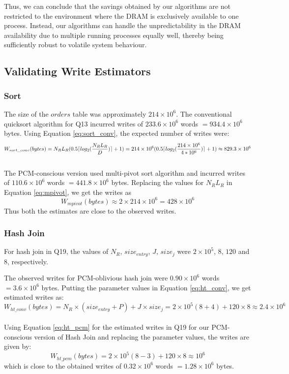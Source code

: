 Thus, we can conclude that the savings obtained by our algorithms are
not restricted to the environment where the DRAM is exclusively available
to one process. Instead, our algorithms can handle the unpredictability
in the DRAM availability due to multiple running processes equally well,
thereby being sufficiently robust to volatile system behaviour.

\subsection{Validating Write Estimators}
\label{validation}
\subsubsection{Sort}

The size of the $orders$ table was approximately $214 \times 10^6$. The conventional quicksort algorithm for Q13 incurred writes of $233.6 \times 10^6$ words $= 934.4 \times 10^6 $bytes. Using Equation \ref{eq:sort_conv}, the expected number of writes were: \\
\begin{dmath}
W_{sort\_conv}(bytes) = N_RL_R (0.5 \lceil log_2(\frac{N_R L_R}{D}) \rceil + 1) \\
= 214 \times 10^6 (0.5 \lceil log_2(\frac{214 \times 10^6}{4 * 10^6}) \rceil + 1) \approx 829.3 \times 10^6 
\end{dmath}
\\
The PCM-conscious version used multi-pivot sort algorithm and incurred writes of $110.6 \times 10^6$ words $= 441.8 \times 10^6 $ bytes. Replacing the values for $N_R L_R$ in Equation \ref{eq:mpivot}, we get the writes as $$W_{mpivot}(bytes) \approx 2 \times 214 \times 10^6  = 428 \times 10^6 $$
Thus both the estimates are close to the observed writes.

\subsubsection{Hash Join}
For hash join in Q19, the values of $N_R$, $size_{entry}$, $J$, $size_{j}$ were $2 \times 10^5$, $8$, $120$ and $8$, respectively. 

The observed writes for PCM-oblivious hash join were $0.90 \times 10^6$ words $= 3.6 \times 10^6$ bytes. Putting the parameter values in Equation \ref{eq:ht_conv}, we get estimated writes as: \\
\begin{dmath}
W_{ht\_conv}(bytes) = N_R \times (size_{entry} + P) + J \times size_{j} =  2 \times 10^5 (8+4) + 120 \times 8 \approx 2.4 \times 10^6 
\end{dmath}
\\
 Using Equation \ref{eq:ht_pcm} for the estimated writes in Q19 for our PCM-conscious version of Hash Join and replacing the  parameter values, the writes are given by:  
$$W_{ht\_pcm}(bytes) = 2 \times 10^5 (8-3) + 120 \times 8 \approx 10^6$$ which is close to the obtained writes of $0.32 \times 10^6$ words $= 1.28 \times 10^6$ bytes.

